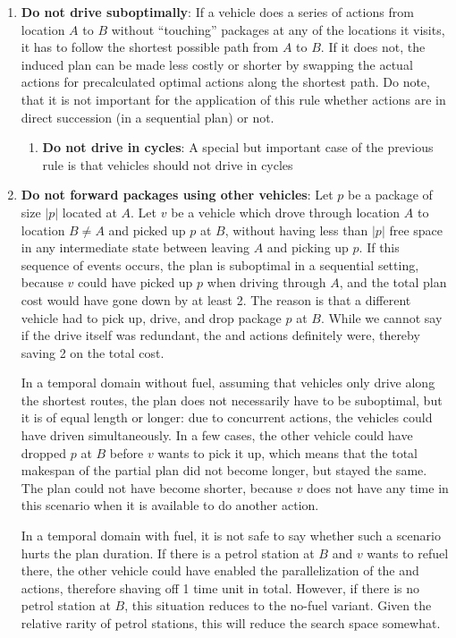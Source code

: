 \begin{enumerate}
\item \textbf{Do not drive suboptimally}: If a vehicle does a series of
\drive{} actions from location $A$ to $B$ without ``touching'' packages at any of the locations it visits,
it has to follow the shortest possible path from $A$ to $B$. If it does not,
the induced plan can be made less costly or shorter by swapping the actual \drive{} actions
for precalculated optimal \drive{} actions along the shortest path.
Do note, that it is not important for the application of this rule whether actions are in direct succession (in a sequential plan) or not.
\begin{enumerate}
\item \textbf{Do not drive in cycles}: A special but important case of the previous rule is that vehicles should not drive in cycles
\end{enumerate}

\item \textbf{Do not forward packages using other vehicles}:
Let $p$ be a package of size $|p|$ located at $A$.
Let $v$ be a vehicle which drove through location $A$ to location $B \neq A$
and picked up $p$ at $B$,
without having less than $|p|$ free space in any intermediate state between leaving $A$ and picking up $p$.
If this sequence of events occurs, the plan is suboptimal in a sequential setting, because
$v$ could have picked up $p$ when driving through $A$, and the total plan cost
would have gone down by at least 2. The reason is that a different vehicle had to pick up, drive, and drop package $p$ at $B$.
While we cannot say if the drive itself
was redundant, the \pickup{} and \drop{} actions definitely were, thereby saving
2 on the total cost. 

In a temporal domain without fuel, assuming that vehicles only drive along the shortest routes,
the plan does not necessarily have to be suboptimal, but it
is of equal length or longer: due to concurrent actions, the vehicles could have driven simultaneously.
In a few cases, the other vehicle could have dropped $p$ at $B$ before $v$ wants to pick it up,
which means that the total makespan of the partial plan did not become longer, but stayed the same.
The plan could not have become shorter, because $v$ does not have any time in this scenario when it is available to do another action.

In a temporal domain with fuel, it is not safe to say whether
such a scenario hurts the plan duration. If there is a petrol station at $B$
and $v$ wants to refuel there, the other vehicle could have enabled the parallelization 
of the  and \pickup{} actions, therefore shaving off 1 time unit in total.
However, if there is no petrol
station at $B$, this situation reduces to the no-fuel variant. Given the relative rarity of petrol stations, this will reduce the search space somewhat.
\end{enumerate}
